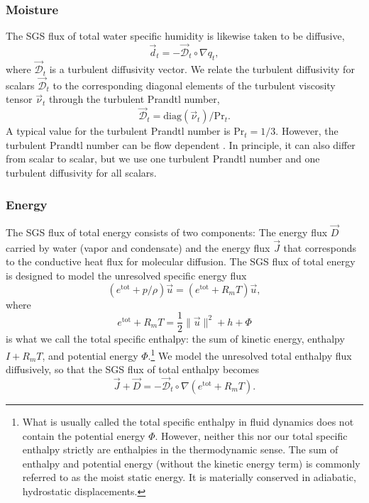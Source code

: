 \documentclass{article}
\begin{document}
\subsubsection{Moisture}

The SGS flux of total water specific humidity is likewise taken to be diffusive,
\begin{equation}\label{eq:sgs-shum-flux}
\vec{d}_{t} = - \vec{\mathcal{D}}_t \circ \nabla q_t,
\end{equation}
where $\vec{\mathcal{D}}_t$ is a turbulent diffusivity vector. We relate the turbulent diffusivity for scalars $\vec{\mathcal{D}}_t$ to the corresponding diagonal elements of the turbulent viscosity tensor $\vec{\nu}_t$ through the turbulent Prandtl number, 
\begin{equation}
\vec{\mathcal{D}}_t = \mathrm{diag}(\vec{\nu}_t) / \mathrm{Pr}_{t}.
\end{equation} 
A typical value for the turbulent Prandtl number is $\mathrm{Pr}_{t} = 1/3$. However, the turbulent Prandtl number can be flow dependent \citep[e.g.,][]{Deardorff80a}. In principle, it can also differ from scalar to scalar, but we use one turbulent Prandtl number and one turbulent diffusivity for all scalars. 

\subsubsection{Energy}

The SGS flux of total energy consists of two components: The energy flux $\vec{D}$ carried by water (vapor and condensate) and the energy flux $\vec{J}$ that corresponds to the conductive heat flux for molecular diffusion. The SGS flux of total energy is designed to model the unresolved specific energy flux 
\[
(e^{\mathrm{tot}} + p/\rho) \vec{u} = (e^{\mathrm{tot}} + R_m T) \vec{u}, 
\]
where
\[
e^{\mathrm{tot}} + R_m T = \frac{1}{2} \| \vec{u} \|^2 + h + \Phi
\]
is what we call the total specific enthalpy: the sum of kinetic energy, enthalpy $I + R_m T$, and potential energy $\Phi$.\footnote{What is usually called the total specific enthalpy in fluid dynamics does not contain the potential energy $\Phi$. However, neither this nor our total specific enthalpy strictly are enthalpies in the thermodynamic sense. The sum of enthalpy and potential energy (without the kinetic energy term) is commonly referred to as the moist static energy. It is materially conserved in adiabatic, hydrostatic displacements.} We model the unresolved total enthalpy flux diffusively, so that the SGS flux of total enthalpy becomes
\begin{equation}\label{e:SGS_energy_flux}
\vec{J} + \vec{D} = - \vec{\mathcal{D}}_t \circ \nabla (e^{\mathrm{tot}} + R_m T).
\end{equation}
\end{document}
